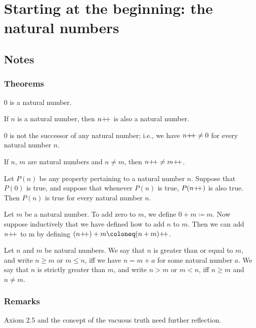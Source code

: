 \section{Starting at the beginning: the natural numbers}
\subsection{Notes}
\subsubsection{Theorems}
\begin{axiom}
    $0$ is a natural number.
\end{axiom}
\begin{axiom}
    If $n$ is a natural number, then $n{+}{\mkern-4mu}{+}$ is also a natural number.
\end{axiom}
\begin{axiom}
    $0$ is not the successor of any natural number; i.e., we have $n{+}{\mkern-4mu}{+} \neq 0$ for every natural number $n$.
\end{axiom}
\begin{axiom}
    If $n$, $m$ are natural numbers and $n \neq m$, then $n{+}{\mkern-4mu}{+} \neq m{+}{\mkern-4mu}{+}$.
\end{axiom}
\begin{axiom}
    Let $P(n)$ be any property pertaining to a natural number $n$. Suppose that $P(0)$ is true, and suppose that whenever $P(n)$ is true, $P(n{+}{\mkern-4mu}{+})$ is also true. Then $P(n)$ is true for every natural number $n$.
\end{axiom}
\begin{definition}
    Let $m$ be a natural number. To add zero to $m$, we define $0 + m \coloneq m$. Now suppose inductively that we have defined how to add $n$ to $m$. Then we can add $n{+}{\mkern-4mu}{+}$ to m by defining $(n\inc) + m \coloneq (n + m)\inc$.
\end{definition}
\begin{definition}
    Let $n$ and $m$ be natural numbers. We say that $n$ is greater than or equal to $m$, and write $n \geq m$ or $m \leq n$, iff we have $n = m + a$ for some natural number $a$. We say that $n$ is strictly greater than $m$, and write $n > m$ or $m < n$, iff $n \geq m$ and $n \neq m$.
\end{definition}
\subsubsection{Remarks}
Axiom 2.5 and the concept of the vacuous truth need further reflection.

